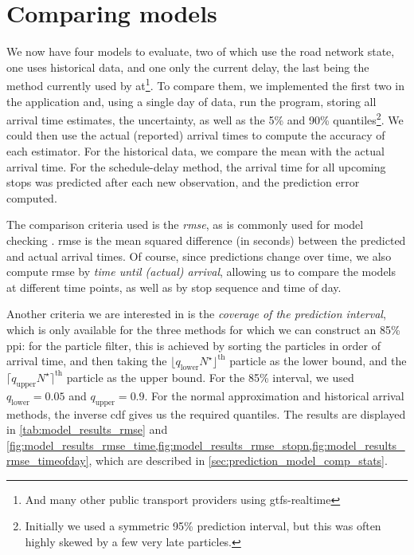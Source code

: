 \section{Comparing models}
\label{sec:prediction_model_comparison}



We now have four models to evaluate, two of which use the road network state, one uses historical data, and one only the current delay, the last being the method currently used by \gls{at}\footnote{And many other public transport providers using \gls{gtfs}-realtime}. To compare them, we implemented the first two in the application and, using a single day of data, run the program, storing all arrival time estimates, the uncertainty, as well as the 5\% and 90\% quantiles\footnote{Initially we used a symmetric 95\% prediction interval, but this was often highly skewed by a few very late particles.}. We could then use the actual (reported) arrival times to compute the accuracy of each estimator. For the historical data, we compare the mean with the actual arrival time. For the schedule-delay method, the arrival time for all upcoming stops was predicted after each new observation, and the prediction error computed.

The comparison criteria used is the \emph{\gls{rmse}}, as is commonly used for model checking \citep{cn}. \Gls{rmse} is the mean squared difference (in seconds) between the predicted and actual arrival times. Of course, since predictions change over time, we also compute \gls{rmse} by \emph{time until (actual) arrival}, allowing us to compare the models at different time points, as well as by stop sequence and time of day.


Another criteria we are interested in is the \emph{coverage of the prediction interval}, which is only available for the three methods for which we can construct an 85\% \gls{ppi}: for the particle filter, this is achieved by sorting the particles in order of arrival time, and then taking the $\lfloor q_\text{lower} N^\star\rfloor^{\text{th}}$ particle as the lower bound, and the $\lceil q_{\text{upper}} N^\star\rceil^{\text{th}}$ particle as the upper bound. For the 85\% interval, we used $q_\text{lower} = 0.05$ and $q_\text{upper} = 0.9$. For the normal approximation and historical arrival methods, the inverse \gls{cdf} gives us the required quantiles. The results are displayed in \cref{tab:model_results_rmse} and \cref{fig:model_results_rmse_time,fig:model_results_rmse_stopn,fig:model_results_rmse_timeofday}, which are described in \cref{sec:prediction_model_comp_stats}.


